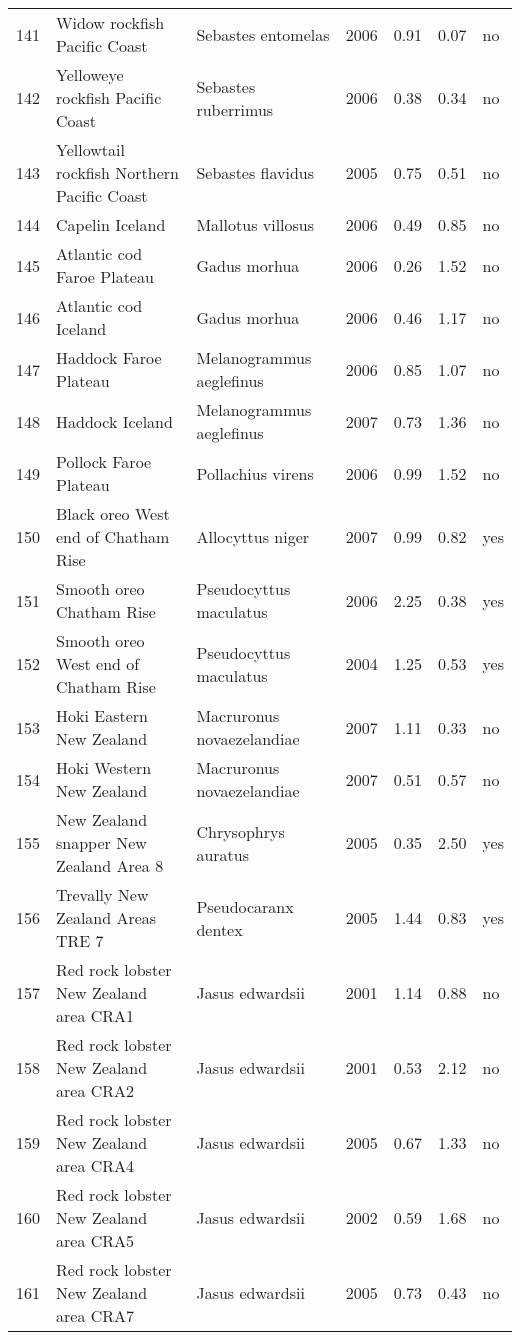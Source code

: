 \begin{table}[ht]
\begin{center}
\begin{tabular}{rllrrrl}
  141 & Widow rockfish Pacific Coast & Sebastes entomelas & 2006 & 0.91 & 0.07 & no \\
  142 & Yelloweye rockfish Pacific Coast & Sebastes ruberrimus & 2006 & 0.38 & 0.34 & no \\
  143 & Yellowtail rockfish Northern Pacific Coast & Sebastes flavidus & 2005 & 0.75 & 0.51 & no \\
  144 & Capelin Iceland & Mallotus villosus & 2006 & 0.49 & 0.85 & no \\
  145 & Atlantic cod Faroe Plateau & Gadus morhua & 2006 & 0.26 & 1.52 & no \\
  146 & Atlantic cod Iceland & Gadus morhua & 2006 & 0.46 & 1.17 & no \\
  147 & Haddock Faroe Plateau & Melanogrammus aeglefinus & 2006 & 0.85 & 1.07 & no \\
  148 & Haddock Iceland & Melanogrammus aeglefinus & 2007 & 0.73 & 1.36 & no \\
  149 & Pollock Faroe Plateau & Pollachius virens & 2006 & 0.99 & 1.52 & no \\
  150 & Black oreo West end of Chatham Rise & Allocyttus niger & 2007 & 0.99 & 0.82 & yes \\
  151 & Smooth oreo Chatham Rise & Pseudocyttus maculatus & 2006 & 2.25 & 0.38 & yes \\
  152 & Smooth oreo West end of Chatham Rise & Pseudocyttus maculatus & 2004 & 1.25 & 0.53 & yes \\
  153 & Hoki Eastern New Zealand & Macruronus novaezelandiae & 2007 & 1.11 & 0.33 & no \\
  154 & Hoki Western New Zealand & Macruronus novaezelandiae & 2007 & 0.51 & 0.57 & no \\
  155 & New Zealand snapper New Zealand Area 8 & Chrysophrys auratus & 2005 & 0.35 & 2.50 & yes \\
  156 & Trevally New Zealand Areas TRE 7 & Pseudocaranx dentex & 2005 & 1.44 & 0.83 & yes \\
  157 & Red rock lobster New Zealand area CRA1 & Jasus edwardsii & 2001 & 1.14 & 0.88 & no \\
  158 & Red rock lobster New Zealand area CRA2 & Jasus edwardsii & 2001 & 0.53 & 2.12 & no \\
  159 & Red rock lobster New Zealand area CRA4 & Jasus edwardsii & 2005 & 0.67 & 1.33 & no \\
  160 & Red rock lobster New Zealand area CRA5 & Jasus edwardsii & 2002 & 0.59 & 1.68 & no \\
  161 & Red rock lobster New Zealand area CRA7 & Jasus edwardsii & 2005 & 0.73 & 0.43 & no \\

\end{tabular}
\end{center}
\end{table}
